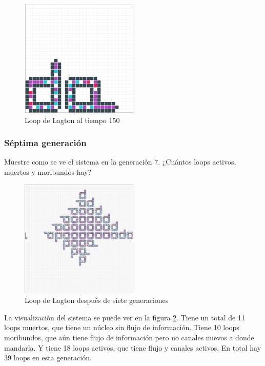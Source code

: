 \documentclass{article}
\begin{document}
\begin{figure}
  \centering
  \includegraphics[width=0.5\textwidth]{imgs/lang2.png}
  \caption{Loop de Lagton al tiempo 150}
  \label{fig:langton-150}
\end{figure}

\subsubsection{Séptima generación}

Muestre como se ve el sistema en la generación 7. ¿Cuántos loops activos,
muertos y moribundos hay?

\begin{figure}
  \centering
  \includegraphics[width=0.5\textwidth]{imgs/lang_gen7.png}
  \caption{Loop de Lagton después de siete generaciones}
  \label{fig:langton-7}
\end{figure}

La visualización del sistema se puede ver en la figura \ref{fig:langton-7}.
Tiene un total de 11 loops muertos, que tiene un núcleo sin flujo de
información. Tiene 10 loops moribundos, que aún tiene flujo de información pero
no canales nuevos a donde mandarla. Y tiene 18 loops activos, que tiene flujo y
canales activos. En total hay 39 loops en esta generación.
\end{document}
